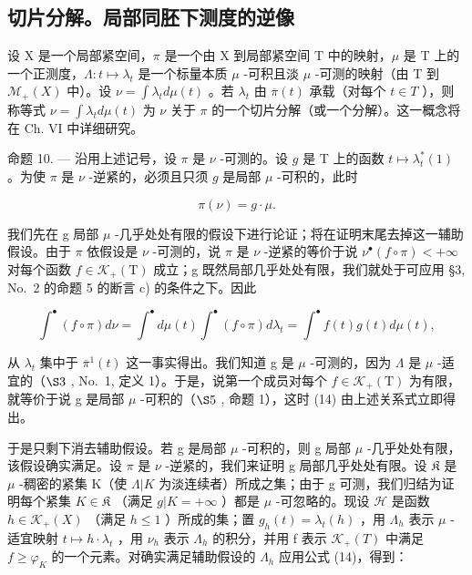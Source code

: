 \subsection{切片分解。局部同胚下测度的逆像}

设 X 是一个局部紧空间，\(\pi\) 是一个由 X 到局部紧空间 T 中的映射，\(\mu\) 是 T 上的一个正测度，\(\Lambda: t \mapsto \lambda_t\) 是一个标量本质 \(\mu\) -可积且淡 \(\mu\) -可测的映射（由 T 到 \(\mathcal{M}_{+}(X)\) 中）。设 \(\nu = \int \lambda_t d\mu(t)\) 。若 \(\lambda_t\) 由 \(\overline{\pi}(t)\) 承载（对每个 \(t \in T\) ），则称等式 \(\nu = \int \lambda_t d\mu(t)\) 为 \(\nu\) 关于 \(\pi\) 的一个切片分解（或一个分解）。这一概念将在 Ch. VI 中详细研究。

命题 10. --- 沿用上述记号，设 \(\pi\) 是 \(\nu\) -可测的。设 \(g\) 是 T 上的函数 \(t \mapsto \lambda_t^*(1)\) 。为使 \(\pi\) 是 \(\nu\) -逆紧的，必须且只须 \(g\) 是局部 \(\mu\) -可积的，此时

\[
\pi (\nu) = g \cdot \mu .\tag{14}
\]

我们先在 g 局部 \(\mu\) -几乎处处有限的假设下进行论证；将在证明末尾去掉这一辅助假设。由于 \(\pi\) 依假设是 \(\nu\) -可测的，说 \(\pi\) 是 \(\nu\) -逆紧的等价于说 \(\nu^{\bullet}(f\circ\pi)<+\infty\) 对每个函数 \(f\in\mathcal{K}_{+}(\mathrm{T})\) 成立；g 既然局部几乎处处有限，我们就处于可应用 §3, No.~2 的命题 5 的断言 c) 的条件之下。因此

\[
\int^ {\bullet} (f \circ \pi) d \nu = \int^ {\bullet} d \mu (t) \int^ {\bullet} (f \circ \pi) d \lambda_ {t} = \int^ {\bullet} f (t) g (t) d \mu (t),
\]

从 \(\lambda_{t}\) 集中于 \(\overline{\pi}^{1}(t)\) 这一事实得出。我们知道 g 是 \(\mu\) -可测的，因为 \(\Lambda\) 是 \(\mu\) -适宜的（\(\S3\) , No.~1, 定义 1）。于是，说第一个成员对每个 \(f \in \mathcal{K}_{+}(\mathrm{T})\) 为有限，就等价于说 g 是局部 \(\mu\) -可积的（\(\S5\) , 命题 1），这时 (14) 由上述关系式立即得出。

于是只剩下消去辅助假设。若 g 是局部 \(\mu\) -可积的，则 g 局部 \(\mu\) -几乎处处有限，该假设确实满足。设 \(\pi\) 是 \(\nu\) -逆紧的，我们来证明 g 局部几乎处处有限。设 \(\mathfrak{K}\) 是 \(\mu\) -稠密的紧集 K（使 \(\Lambda|K\) 为淡连续者）所成之集；由于 g 可测，我们归结为证明每个紧集 \(K \in \mathfrak{K}\) （满足 \(g|K = +\infty\) ）都是 \(\mu\) -可忽略的。现设 \(\mathcal{H}\) 是函数 \(h \in \mathcal{K}_{+}(X)\) （满足 \(h \leqslant 1\) ）所成的集；置 \(g_{h}(t) = \lambda_{t}(h)\) ，用 \(\Lambda_{h}\) 表示 \(\mu\) -适宜映射 \(t \mapsto h \cdot \lambda_{t}\) ，用 \(\nu_{h}\) 表示 \(\Lambda_{h}\) 的积分，并用 f 表示 \(\mathcal{K}_{+}(T)\) 中满足 \(f \geqslant \varphi_{K}\) 的一个元素。对确实满足辅助假设的 \(\Lambda_{h}\) 应用公式 (14)，得到：

